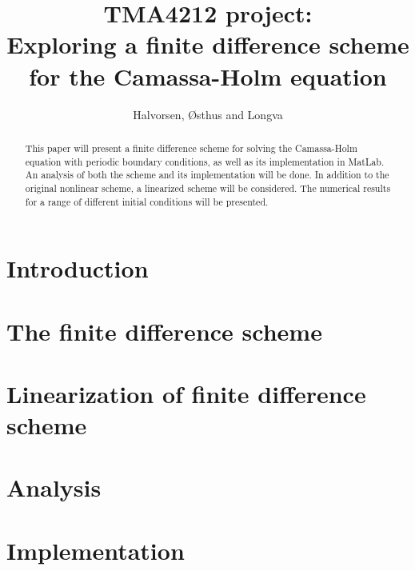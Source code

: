 \documentclass{article}
\title{TMA4212 project: \\ Exploring a finite difference scheme for the Camassa-Holm equation}
\author{Halvorsen, Østhus and Longva}
\begin{document}
\maketitle

\begin{abstract}
This paper will present a finite difference scheme for solving the Camassa-Holm equation with periodic boundary conditions, as well as its implementation in MatLab. An analysis of both the scheme and its implementation will be done. In addition to the original nonlinear scheme, a linearized scheme will be considered. The numerical results for a range of different initial conditions will be presented. 
\end{abstract}

\newpage

\section*{Introduction}


\newpage

\section*{The finite difference scheme}


\newpage

\section*{Linearization of finite difference scheme}


\newpage

\section*{Analysis}



\section*{Implementation}



{}

\end{document}
